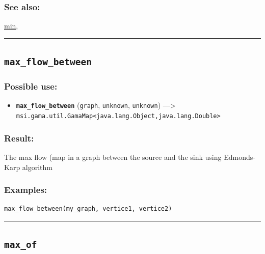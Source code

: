 \documentclass[]{book}
\providecommand{\tightlist}{%
  \setlength{\itemsep}{0pt}\setlength{\parskip}{0pt}}
\theoremstyle{definition}
\theoremstyle{definition}
\theoremstyle{definition}
\theoremstyle{remark}
\begin{document}
\subsubsection{See also:}\label{see-also-134}

\href{operators-i-to-m.html\#min}{min},

\begin{center}\rule{0.5\linewidth}{\linethickness}\end{center}

\subsection{\texorpdfstring{\texttt{max\_flow\_between}}{max\_flow\_between}}\label{max_flow_between}

\subsubsection{Possible use:}\label{possible-use-340}

\begin{itemize}
\tightlist
\item
  \textbf{\texttt{max\_flow\_between}} (\texttt{graph},
  \texttt{unknown}, \texttt{unknown}) ---\textgreater{}
  \texttt{msi.gama.util.GamaMap\textless{}java.lang.Object,java.lang.Double\textgreater{}}
\end{itemize}

\subsubsection{Result:}\label{result-329}

The max flow (map in a graph between the source and the sink using
Edmonds-Karp algorithm

\subsubsection{Examples:}\label{examples-233}

\begin{verbatim}
max_flow_between(my_graph, vertice1, vertice2) 
\end{verbatim}

\begin{center}\rule{0.5\linewidth}{\linethickness}\end{center}

\subsection{\texorpdfstring{\texttt{max\_of}}{max\_of}}\label{max_of}
\end{document}
